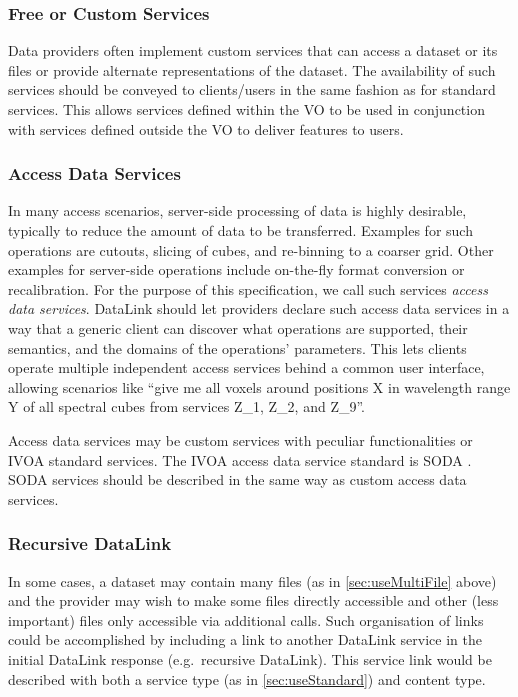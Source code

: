 \documentclass[11pt,a4paper]{ivoa}
\begin{document}
\subsubsection{Free or Custom Services}
\label{sec:useCustom}

Data providers often implement custom services that can access a dataset
or its files or provide alternate representations of the dataset. The
availability of such services should be conveyed to clients/users in
the same fashion as for standard services. This allows services defined
within the VO to be used in conjunction with services defined outside
the VO to deliver features to users.


\subsubsection{Access Data Services}

In many access scenarios, server-side processing of data is
highly desirable, typically to reduce the amount of data to be
transferred. Examples for such operations are cutouts, slicing of
cubes, and re-binning to a coarser grid. Other examples for server-side
operations include on-the-fly format conversion or recalibration. For
the purpose of this specification, we call such services
{\em access data services}.
DataLink should let providers declare such access data services
in a way that a generic client can discover what operations are supported,
their semantics, and the domains of the operations' parameters. This lets
clients operate multiple independent access services behind a common user
interface, allowing scenarios like ``give me all voxels around positions
X in wavelength range Y of all spectral cubes from services Z\_1, Z\_2,
and Z\_9''.

Access data services may be custom services with peculiar functionalities
or IVOA standard services. The IVOA access data service standard is
SODA \citep{2017ivoa.spec.0517B}.
SODA services should  be described in the same
way as custom access data services.

\subsubsection{Recursive DataLink}

In some cases, a dataset may contain many files
(as in \ref{sec:useMultiFile} above)
and the provider may wish to make some files directly accessible and
other (less important) files only accessible via additional calls. Such
organisation of links could be accomplished by including a link to
another DataLink service in the initial DataLink response (e.g.\ recursive
DataLink). This service link would be described with both a service type
(as in \ref{sec:useStandard}) and content type.
\end{document}
